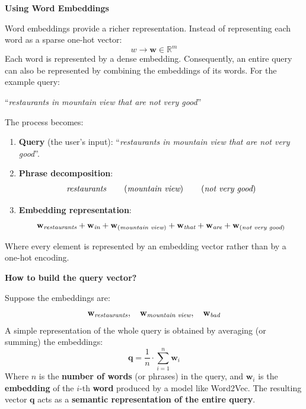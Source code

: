 \highspace
\begin{flushleft}
    \textcolor{Green3}{ \textbf{Using Word Embeddings}}
\end{flushleft}
Word embeddings provide a richer representation. Instead of representing each word as a sparse one-hot vector:
\begin{equation*}
    w \longrightarrow \mathbf{w} \in \mathbb{R}^m
\end{equation*}
Each word is represented by a dense embedding. Consequently, an entire query can also be represented by combining the embeddings of its words. For the example query:
\begin{center}
    ``\emph{restaurants in mountain view that are not very good}''
\end{center}
\noindent
The process becomes:
\begin{enumerate}
    \item \textbf{Query} (the user's input): ``\emph{restaurants in mountain view that are not very good}''.
    \item \textbf{Phrase decomposition}:
    \begin{gather*}
        \emph{restaurants} \qquad \left(\emph{mountain view}\right) \qquad \left(\emph{not very good}\right)
    \end{gather*}
    \item \textbf{Embedding representation}:
    \begin{gather*}
        \mathbf{w}_{\emph{restaurants}} + \mathbf{w}_{\emph{in}} + \mathbf{w}_{(\emph{mountain view})} + \mathbf{w}_{\emph{that}} + \mathbf{w}_{\emph{are}} + \mathbf{w}_{(\emph{not very good})}
    \end{gather*}
\end{enumerate}
Where every element is represented by an embedding vector rather than by a one-hot encoding.

\highspace
\begin{flushleft}
    \textcolor{Green3}{ \textbf{How to build the query vector?}}
\end{flushleft}
Suppose the embeddings are:
\begin{equation*}
    \mathbf{w}_{\emph{restaurants}}, \quad \mathbf{w}_{\emph{mountain view}}, \quad \mathbf{w}_{\emph{bad}}
\end{equation*}
A simple representation of the whole query is obtained by averaging (or summing) the embeddings:
\begin{equation}
    \mathbf{q} = \frac{1}{n} \cdot \sum_{i=1}^{n} \mathbf{w}_i
\end{equation}
Where $n$ is the \textbf{number of words} (or phrases) in the query, and $\mathbf{w}_i$ is the \textbf{embedding} of the $i$-th \textbf{word} produced by a model like Word2Vec. The resulting vector $\mathbf{q}$ acts as a \textbf{semantic representation of the entire query}.


